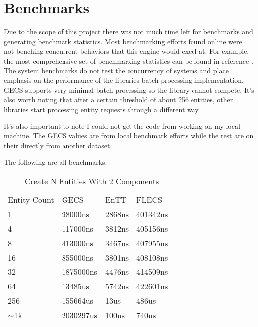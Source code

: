 \section{Benchmarks}
Due to the scope of this project there was not much time left for benchmarks and generating benchmark statistics. Most benchmarking efforts found online were not benching concurrent behaviors that this engine would excel at. For example, the most comprehensive set of benchmarking statistics can be found in reference \cite{ECS_benchmark}. The system benchmarks do not test the concurrency of systems and place emphasis on the performance of the libraries batch processing implementation. GECS supports very minimal batch processing so the library cannot compete. It's also worth noting that after a certain threshold of about 256 entities, other libraries start processing entity requests through a different way.

It's also important to note I could not get the code from \cite{ECS_benchmark} working on my local machine. The GECS values are from local benchmark efforts while the rest are on their directly from another dataset.

The following are all benchmarks:

\begin{table}[htbp]
    \centering
    \begin{tabular}{lllll}
        Entity Count & GECS      & EnTT   & FLECS    &  \\
        1            & 98000ns   & 2868ns & 401342ns &  \\
        4            & 117000ns  & 3812ns & 405156ns &  \\
        8            & 413000ns  & 3467ns & 407955ns &  \\
        16           & 855000ns  & 3801ns & 408108ns &  \\
        32           & 1875000ns & 4476ns & 414509ns &  \\
        64           & 13485us   & 5742ns & 422601ns &  \\
        256          & 155664us  & 13us   & 486us    &  \\
        $\sim$1k     & 2030297us & 100us  & 740us    & 
    \end{tabular}
    \caption{Create N Entities With 2 Components}    
\end{table}

